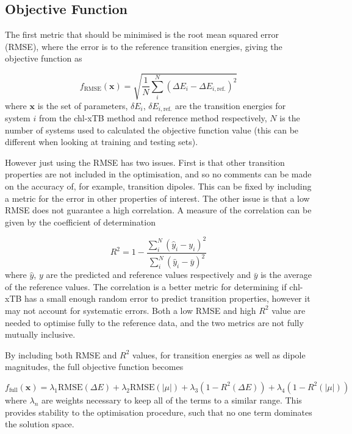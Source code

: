 \subsection{Objective Function}
\label{subsec:obj_func}
The first metric that should be minimised is the root mean squared error (RMSE), 
where the error is to the reference transition energies, giving the objective function 
as

\begin{equation}
f_{\text{RMSE}}\left(\mathbf{x}\right) = \sqrt{ \frac{1}{N} \sum^N_i \left( \Delta E_i  - \Delta E_{i, \text{ref.}}\right)^2}
\end{equation}
%
where $\textbf{x}$ is the set of parameters, $\delta E_i$, $\delta E_{i,\text{ref.}}$ 
are the transition energies for system $i$ from the chl-xTB method and reference
method respectively, $N$ is the number of systems used to calculated the objective
function value (this can be different when looking at training and testing sets).

However just using the RMSE has two issues. First is that other transition properties
are not included in the optimisation, and so no comments can be made on the accuracy 
of, for example, transition dipoles. This can be fixed by including a metric for
the error in other properties of interest. The other issue is that a low RMSE does
not guarantee a high correlation. A measure of the correlation can be given by the
coefficient of determination

\begin{equation}
R^2 = 1 - \frac{\sum^N_i \left(\hat{y}_i - y_i \right)^2}{\sum^N_i \left(\hat{y}_i - \bar{y}\right)^2}
\end{equation}
%
where $\hat{y}$, $y$ are the predicted and reference values respectively and $\bar{y}$
is the average of the reference values. The correlation is a better metric for determining
if chl-xTB has a small enough random error to predict transition properties, however
it may not account for systematic errors. Both a low RMSE and high $R^2$ value are
needed to optimise fully to the reference data, and the two metrics are not fully
mutually inclusive.

By including both RMSE and $R^2$ values, for transition energies as well as dipole
magnitudes, the full objective function becomes

\begin{equation}
f_{\text{full}} \left( \mathbf{x} \right) = \lambda_1 \text{RMSE} \left(\Delta E \right)+ \lambda_2 \text{RMSE}\left( \left| \mu \right| \right) + \lambda_3 \left(1 - R^2 \left( \Delta E \right)\right) + \lambda_4 \left( 1 - R^2 \left( \left| \mu \right| \right)\right)
\end{equation}
%
where $\lambda_n$ are weights necessary to keep all of the terms to a similar range.
This provides stability to the optimisation procedure, such that no one term dominates
the solution space.

